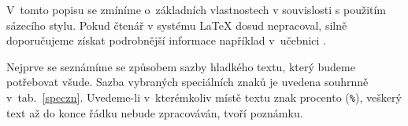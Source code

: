 \documentclass[twoside,12pt]{article}
\begin{document}
V~tomto popisu se zmíníme o~základních vlastnostech v souvislosti s použitím
sázecího stylu. Pokud čtenář v systému \LaTeX{} dosud nepracoval, silně
doporučujeme získat podrobnější informace například v~učebnici \cite{latzac}.

\def\bsl{\char92}
\def\lsv{\char123}
\def\rsv{\char125}

Nejprve se seznámíme se způsobem sazby hladkého textu, který budeme potřebovat
všude. Sazba vybraných speciálních znaků je uvedena souhrnně v~tab.~\ref{speczn}.
Uvedeme-li v~kterémkoliv místě textu znak procento (\texttt{\%}), veškerý text
až do konce řádku nebude zpracováván, tvoří poznámku.

\end{document}
